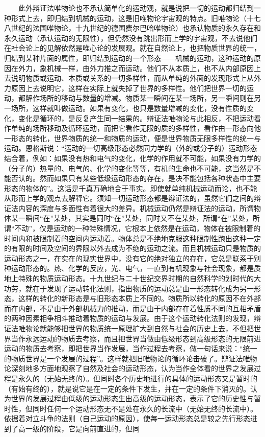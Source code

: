 \documentclass[cn,11pt,chinese]{elegantbook}
\begin{document}
　　此外辩证法唯物论也不承认简单化的运动观，就是说把一切的运动都归结到一种形式上去，即归结到机械的运动，这是旧唯物论宇宙观的特点。旧唯物论（十七八世纪的法国唯物论，十九世纪的德国费尔巴哈唯物论）也承认物质的永久存在和永久运动（承认运动的无限性），但仍然没有跳出形而上学的宇宙观，不去说他们在社会论上的见解依然是唯心论的发展观。就在自然论上，也把物质世界的统一，归结到某种片面的属性，即归结到运动的一个形态——机械的运动，这种运动的原因在外力，象机械一样，由外力推之而运动。他们不从本质上，也不从内部原因上去说明物质或运动、本质或关系的一切多样性，而从单纯的外面的发现形式上从外力原因上去说明它，这样在实际上就失掉了世界的多样性。他们把世界一切的运动，都解作场所的移动与数量的增减。物质某一瞬间在某一场所，另一瞬间则在另一场所，这样就叫做运动。如果有变化，也只是数量增减的变化，没有性质的变化，变化是循环的，是反复产生同一结果的。辩证法唯物论与此相反，不把运动看作单纯的场所移动及循环运动，而把它看作无限的质的多样性，看作由一形态向他一形态的转化，世界物质的统一和物质的运动，便是世界物质无限多样性的统一与运动。恩格斯说：“运动的一切高级形态必然同力学的（外的或分子的）运动形态结合着，例如：如果没有热和电气的变化，化学的作用就不可能，如果没有力学的（分子的）热量的、电气的、化学的变化等等，有机的生命也不可能，这当然是不能否认的。然而如果只有某些低级运动形态的存在，是决不能包括各种状态中主要形态的物体的”。这话是千真万确地合于事实。即使就单纯机械运动而论，也不能从形而上学的观点去解释它。须知一切运动形态都是辩证法的，虽然它们之间的辩证法内容的深度与多面性有着很大的差异。机械运动仍然是辩证法的运动，所谓物体某一瞬间“在”某处，其实是同时“在”某处，同时又不在某处，所谓“在”某处，所谓“不动”，仅是运动的一种特殊情况，它根本上依然是在运动，物体在被限制着的时间内和被限制着的空间内运动着。物体总是不绝地克服这种限制性跑出这种一定的有限的时间及空间的界限以外去成为不绝的运动之流。而且机械运动只是物质的运动形态之一，在实在的现实世界中，没有它的绝对独立的存在，它总是联系于别种运动形态的。热、化学的反应，光、电气，一直到有机现象与社会现象，都是质地上特殊的物质运动形态。十九世纪与二十世纪交界时期的自然科学的划时代的大功劳，就在于发现了运动转化法则，指出物质的运动总是由一形态转化成为另一形态，这样的转化的新形态是与旧形态本质上不同的。物质所以转化的原因不在外部而在内部，不是由于外部机械力的推动，而是由于内部存在着性质不同的互相矛盾的两种因素相争相斗推动着物质的运动与发展。由于这个运动转化法则的发现，辩证法唯物论就能够把世界的物质统一原理扩大到自然与社会的历史上去，不但把世界当作永远运动的物质去考察，而且把世界当做由低级形态到高级形态的无限前进运动的物质去考察，即把世界当作发展，当作过程去考察，做一句话来说：“统一的物质世界是一个发展的过程”。这样就把旧唯物论的循环论击破了。辩证法唯物论深刻地多方面地观察了自然及社会的运动形态，认为当作全体看的世界之发展过程是永久的（无始无终的）。但同时各个历史地进行的具体的运动形态又是暂时的（有始有终的），就是说它是在一定的条件下发生，并在一定的条件下消灭的。认为世界的发展过程由低级的运动形态生出高级的运动形态，表示了它的历史性与暂时性，但同时任何一个运动形态无不是处在永久的长流中（无始无终的长流中）。依据着对立斗争的法则（自己运动的原因），使每一运动形态总是较之先行形态进到了高一级的阶段，它是向前直进的，但同
\end{document}
